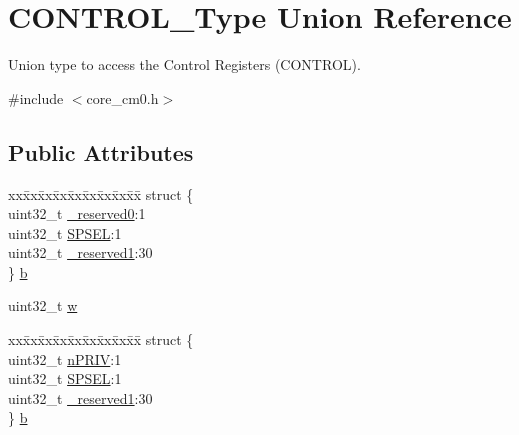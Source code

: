 \hypertarget{union_c_o_n_t_r_o_l___type}{}\section{C\+O\+N\+T\+R\+O\+L\+\_\+\+Type Union Reference}
\label{union_c_o_n_t_r_o_l___type}


Union type to access the Control Registers (C\+O\+N\+T\+R\+OL).  




{\ttfamily \#include $<$core\+\_\+cm0.\+h$>$}

\subsection*{Public Attributes}
\begin{DoxyCompactItemize}
\item 
\begin{tabbing}
xx\=xx\=xx\=xx\=xx\=xx\=xx\=xx\=xx\=\kill
struct \{\\
\>uint32\_t \hyperlink{union_c_o_n_t_r_o_l___type_af8c314273a1e4970a5671bd7f8184f50}{\_reserved0}:1\\
\>uint32\_t \hyperlink{union_c_o_n_t_r_o_l___type_a8cc085fea1c50a8bd9adea63931ee8e2}{SPSEL}:1\\
\>uint32\_t \hyperlink{union_c_o_n_t_r_o_l___type_aa7a5662079a447f801034d108f80ce49}{\_reserved1}:30\\
\} \hyperlink{union_c_o_n_t_r_o_l___type_adc6a38ab2980d0e9577b5a871da14eb9}{b}\\

\end{tabbing}\item 
uint32\+\_\+t \hyperlink{union_c_o_n_t_r_o_l___type_a6b642cca3d96da660b1198c133ca2a1f}{w}
\item 
\begin{tabbing}
xx\=xx\=xx\=xx\=xx\=xx\=xx\=xx\=xx\=\kill
struct \{\\
\>uint32\_t \hyperlink{union_c_o_n_t_r_o_l___type_a35c1732cf153b7b5c4bd321cf1de9605}{nPRIV}:1\\
\>uint32\_t \hyperlink{union_c_o_n_t_r_o_l___type_a8cc085fea1c50a8bd9adea63931ee8e2}{SPSEL}:1\\
\>uint32\_t \hyperlink{union_c_o_n_t_r_o_l___type_aa7a5662079a447f801034d108f80ce49}{\_reserved1}:30\\
\} \hyperlink{union_c_o_n_t_r_o_l___type_ae3b4861e899b1f68818b60033a3914d9}{b}\\


\end{tabbing}
\end{DoxyCompactItemize}
